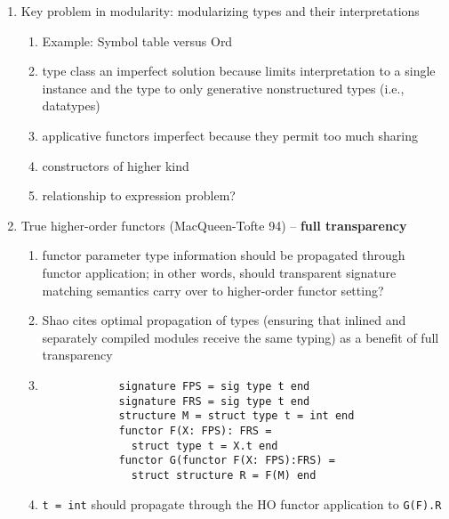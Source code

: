 \documentclass[9pt]{sigplanconf}
\begin{document}
{\begin{enumerate}
\begin{enumerate}
		\item Primarily through functor application
		\item Shao fully transparent signature calculus
		\item SML90 - only explicit sharing equations and structure (identity) sharing 
		\item SML93 - plus definitional sharing
		\item SML97 - plus where type and definitional specs; structure identity sharing eliminated
		\item existential types, dependent sums, translucent sums, singleton kinds/signatures, Shao flexroot
	\end{enumerate}
	\item Key problem in modularity: modularizing types and their interpretations
	\begin{enumerate}
		\item Example: Symbol table versus Ord
		\item type class an imperfect solution because limits interpretation to a single instance and the type to only generative nonstructured types (i.e., datatypes)
		\item applicative functors imperfect because they permit too much sharing
		\item constructors of higher kind
		\item relationship to expression problem?
	\end{enumerate}
	\item True higher-order functors (MacQueen-Tofte 94) -- {\bf full transparency}
	\begin{enumerate}
		\item functor parameter type information should be propagated through functor application; in other words, should transparent signature matching semantics carry over to higher-order functor setting?
		\item Shao \cite{shao98} cites optimal propagation of types (ensuring that inlined and separately compiled modules receive the same typing) as a benefit of full transparency
		\item \begin{verbatim}
			signature FPS = sig type t end
			signature FRS = sig type t end
			structure M = struct type t = int end
			functor F(X: FPS): FRS = 
			  struct type t = X.t end
			functor G(functor F(X: FPS):FRS) = 
			  struct structure R = F(M) end
		\end{verbatim}
		\item \verb|t = int| should propagate through the HO functor application to \verb|G(F).R|

\end{enumerate}
\end{enumerate}}
\end{document}
